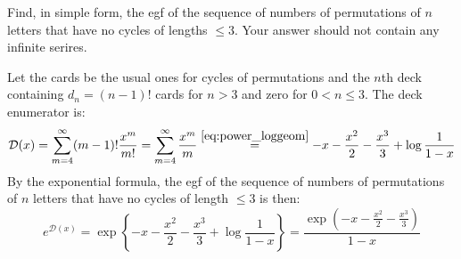 \begin{exercise}
    Find, in simple form, the egf of the sequence of numbers of permutations of $n$ letters that have no cycles of lengths $\leq 3$. Your answer should not contain any infinite serires.
\end{exercise}
\begin{solution}
    Let the cards be the usual ones for cycles of permutations and the $n$th deck containing $d_n = (n-1)!$ cards for $n > 3$ and zero for $0<n\leq 3$. The deck enumerator is:
    \[
        \mathcal{D}(x) = \sum_{m=4}^\infty (m-1)! \frac{x^m}{m!} = \sum_{m=4}^\infty \frac{x^m}{m} \overset{\eqref{eq:power_loggeom}}{=} -x -\frac{x^2}{2} - \frac{x^3}{3} + \log \frac{1}{1-x}
    \]
    By the exponential formula, the egf of the sequence of numbers of permutations of $n$ letters that have no cycles of length $\leq 3$ is then:
    \[
        e^{\mathcal{D}(x)} = \exp\left\{-x -\frac{x^2}{2} - \frac{x^3}{3} + \log \frac{1}{1-x}\right\} = \frac{\exp(-x-\frac{x^2}{2} - \frac{x^3}{3})}{1-x}
    \]
\end{solution}

